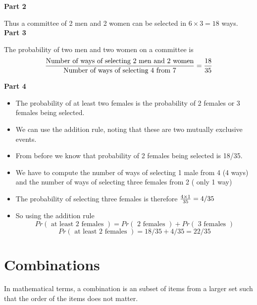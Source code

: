 \documentclass[12pt]{report}
\begin{document}
		{\Large
			
			\textbf{Part 2}
			
			Thus a committee of 2 men and 2 women can be selected in $ 6 \times 3  = 18 $ ways.\\
			\bigskip
			\textbf{Part 3}
			
			The probability of two men and two women on a committee is
			\[ {\mbox{Number of ways of selecting 2 men and 2 women} \over \mbox{Number of ways of selecting 4 from 7}} = {18 \over 35 }\]
			

			
			\textbf{Part 4}
			\begin{itemize}
				\item The probability of at least two females is the probability of 2 females or 3 females being selected.
				\item We can use the addition rule, noting that these are two mutually exclusive events.
				\item From before we know that probability of 2 females being selected is 18/35.
				\item We have to compute the number of ways of selecting 1 male from 4 (4 ways) and the number of ways of selecting three females from 2 ( only 1 way)
				\item The probability of selecting three females is therefore ${4 \times 1 \over 35} = 4/35$
				\item So using the addition rule
				\[ Pr(\mbox{ at least 2 females }) = Pr(\mbox{ 2 females }) + Pr(\mbox{ 3 females }) \]
				\[ Pr(\mbox{ at least 2 females })  = 18/35 + 4/35 = 22/35 \]
			\end{itemize}
			
		}
\newpage		

		\section*{Combinations}
		In mathematical terms, a combination is an subset of items from a larger set such that the order of the items does not matter.
		
\end{document}
